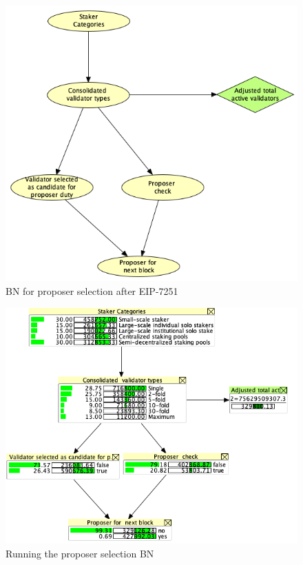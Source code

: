 \begin{figure}[htbp]
\begin{center}
\includegraphics[width=0.6\linewidth]{images/proposer-bn}
\caption{BN for proposer selection after EIP-7251}
\label{fig:proposerbn}
\end{center}
\end{figure}

\begin{figure}[htbp]
\begin{center}
\includegraphics[width=0.7\linewidth]{images/proposer-bn-run}
\caption{Running the proposer selection BN}
\label{fig:proposerbnrun}
\end{center}
\end{figure}

\clearpage

